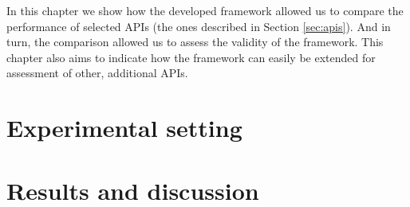 \newcommand*{\ResultsPath}{05-results}
In this chapter we show how the developed framework  allowed us to compare the performance of selected APIs (the ones described in Section \ref{sec:apis}). 
And in turn, the comparison allowed us to assess the validity of the framework.
This chapter also aims to indicate how the framework can easily be extended for assessment of other, additional APIs.

\section{Experimental setting\label{sec:experimental-setting}} 


\section{Results and discussion\label{sec:results-and-discussion}}

